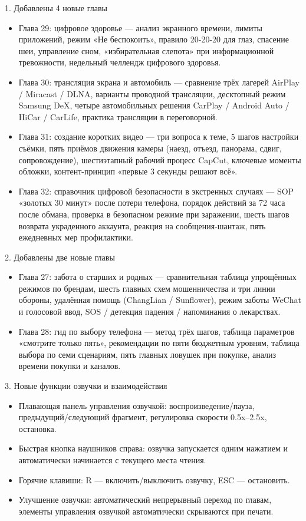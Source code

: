 
1. Добавлены 4 новые главы

\begin{itemize}
  \item Глава 29: цифровое здоровье — анализ экранного времени, лимиты приложений, режим «Не беспокоить», правило 20-20-20 для глаз, спасение шеи, управление сном, «избирательная слепота» при информационной тревожности, недельный челлендж цифрового здоровья.
  \item Глава 30: трансляция экрана и автомобиль — сравнение трёх лагерей AirPlay / Miracast / DLNA, варианты проводной трансляции, десктопный режим Samsung DeX, четыре автомобильных решения CarPlay / Android Auto / HiCar / CarLife, практика трансляции в переговорной.
  \item Глава 31: создание коротких видео — три вопроса к теме, 5 шагов настройки съёмки, пять приёмов движения камеры (наезд, отъезд, панорама, сдвиг, сопровождение), шестиэтапный рабочий процесс CapCut, ключевые моменты обложки, контент-принцип «первые 3 секунды решают всё».
  \item Глава 32: справочник цифровой безопасности в экстренных случаях — SOP «золотых 30 минут» после потери телефона, порядок действий за 72 часа после обмана, проверка в безопасном режиме при заражении, шесть шагов возврата украденного аккаунта, реакция на сообщения-шантаж, пять ежедневных мер профилактики.
\end{itemize}

2. Добавлены две новые главы

\begin{itemize}
  \item Глава 27: забота о старших и родных — сравнительная таблица упрощённых режимов по брендам, шесть главных схем мошенничества и три линии обороны, удалённая помощь (ChangLian / Sunflower), режим заботы WeChat и голосовой ввод, SOS / детекция падения / напоминания о лекарствах.
  \item Глава 28: гид по выбору телефона — метод трёх шагов, таблица параметров «смотрите только пять», рекомендации по пяти бюджетным уровням, таблица выбора по семи сценариям, пять главных ловушек при покупке, анализ времени покупки и каналов.
\end{itemize}

3. Новые функции озвучки и взаимодействия

\begin{itemize}
  \item Плавающая панель управления озвучкой: воспроизведение/пауза, предыдущий/следующий фрагмент, регулировка скорости 0.5x–2.5x, остановка.
  \item Быстрая кнопка наушников справа: озвучка запускается одним нажатием и автоматически начинается с текущего места чтения.
  \item Горячие клавиши: R — включить/выключить озвучку, ESC — остановить.
  \item Улучшение озвучки: автоматический непрерывный переход по главам, элементы управления озвучкой автоматически скрываются при печати.
\end{itemize}

